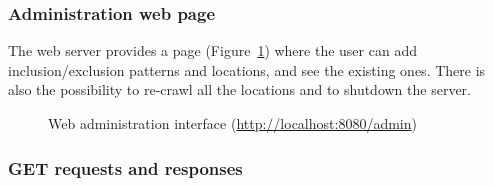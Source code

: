 \subsubsection*{Administration web page}

The web server provides a page (Figure~\ref{fig:admin}) where the user can add inclusion/exclusion patterns and locations, and see the existing ones. There is also the possibility to re-crawl all the locations and to shutdown the server. 

\begin{figure}
  \begin{center}
  \end{center}
  \caption{Web administration interface (\url{http://localhost:8080/admin})}
  \label{fig:admin}
\end{figure}


\subsubsection*{GET requests and responses}

